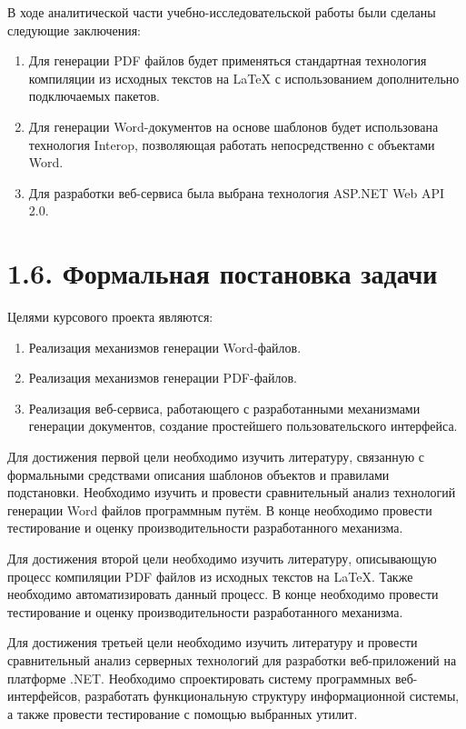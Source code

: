 В ходе аналитической части учебно-исследовательской работы были сделаны следующие заключения:

\begin{enumerate}
\item Для генерации PDF файлов будет применяться стандартная технология компиляции из исходных текстов на LaTeX с использованием дополнительно подключаемых пакетов.
\item Для генерации Word-документов на основе шаблонов будет использована технология Interop, позволяющая работать непосредственно с объектами Word.
\item Для разработки веб-сервиса была выбрана технология ASP.NET Web API 2.0.
\end{enumerate}

\section{1.6. Формальная постановка задачи}

Целями курсового проекта являются:

\begin{enumerate}
\item Реализация механизмов генерации Word-файлов.
\item Реализация механизмов генерации PDF-файлов.
\item Реализация веб-сервиса, работающего с разработанными механизмами генерации документов, создание простейшего пользовательского интерфейса.
\end{enumerate}

    Для достижения первой цели необходимо изучить литературу, связанную с формальными средствами описания шаблонов объектов и правилами подстановки. Необходимо изучить и провести сравнительный анализ технологий генерации Word файлов программным путём. В конце необходимо провести тестирование и оценку производительности разработанного механизма.
    
    Для достижения второй цели необходимо изучить литературу, описывающую процесс компиляции PDF файлов из исходных текстов на LaTeX. Также необходимо автоматизировать данный процесс. В конце необходимо провести тестирование и оценку производительности разработанного механизма.
    
    Для достижения третьей цели необходимо изучить литературу и провести сравнительный анализ серверных технологий для разработки веб-приложений на платформе .NET. Необходимо спроектировать систему программных веб-интерфейсов, разработать функциональную структуру информационной системы, а также провести тестирование с помощью выбранных утилит.
